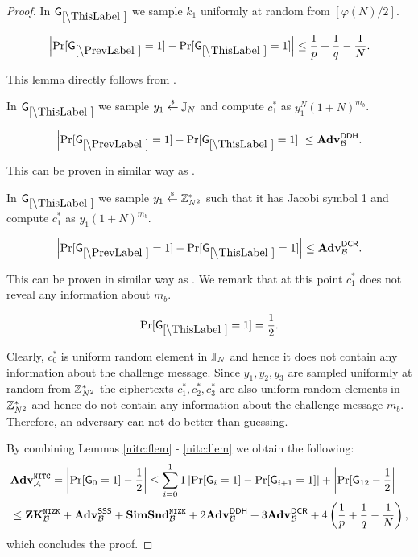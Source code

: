\begin{proof}
In $\games_\thisgame$ we sample $k_1$ uniformly at random from $[\varphi(N)/2]$. 

\begin{lemma}
\[
\left|\Pr[\games_\prevgame = 1] - \Pr[\games_\thisgame = 1]\right| \leq \frac{1}{p}+\frac{1}{q}-\frac{1}{N}.
\]
\end{lemma}

This lemma directly follows from .

In $\games_\thisgame$ we sample $y_1 \stackrel{{\scriptscriptstyle\$}}{\leftarrow} \mathbb{J}_N$ and compute $c_1^*$ as  $y_1^{N} (1+N)^{m_b}$. 

\begin{lemma}
\[
\left|\Pr[\games_\prevgame = 1] - \Pr[\games_\thisgame = 1]\right| \leq \advtg_\advB^\ddh.
\]
\end{lemma}
This can be proven in similar way as .

In $\games_\thisgame$ we sample $y_1 \stackrel{{\scriptscriptstyle\$}}{\leftarrow} \mathbb{Z}_{N^2}^*$ such that it has Jacobi symbol 1 and compute $c_1^*$ as $y_1(1+N)^{m_b}$. 

\begin{lemma}
\[
\left|\Pr[\games_\prevgame = 1] - \Pr[\games_\thisgame = 1]\right| \leq \advtg_\advB^\dcr.
\]
\end{lemma}
This can be proven in similar way as . We remark that at this point $c_1^*$ does not reveal any information about $m_b$.

\begin{lemma}\label{nitc:llem}
\[
\Pr[\games_\thisgame = 1] = \half.
\]
\end{lemma}

Clearly, $c_0^*$ is uniform random element in $\mathbb{J}_N$ and hence it does not contain any information about the challenge message. Since $y_1, y_2, y_3$ are sampled uniformly at random from $\mathbb{Z}_{N^2}^*$ the ciphertexts $c_1^*, c_2^*, c_3^*$ are also uniform random elements in $\mathbb{Z}_{N^2}^*$ and hence do not contain any information about the challenge message $m_b$. Therefore, an adversary can not do better than guessing.

By combining Lemmas \ref{nitc:flem} - \ref{nitc:llem} we obtain the following:
\begin{align*}
&\mathbf{Adv}^{\mathtt{NITC}}_{\mathcal{A}} = \left| \Pr[\mathsf{G}_0 = 1] - \frac{1}{2} \right| \leq \sum_{i=0}^11 \left|\Pr[\mathsf{G}_i = 1] - \Pr[\mathsf{G}_{i+1} = 1] \right| + \left|\Pr[\mathsf{G}_{12}- \frac{1}{2}\right| \\
 &\leq \mathbf{ZK}^{\mathtt{NIZK}}_{\mathcal{B}} + \mathbf{Adv}^{\mathsf{SSS}}_{\mathcal{B}} + \mathbf{SimSnd}^{\mathtt{NIZK}}_{\mathcal{B}} + 2 \mathbf{Adv}^{\mathsf{DDH}}_{\mathcal{B}} + 3 \mathbf{Adv}^{\mathsf{DCR}}_{\mathcal{B}} + 4 \left( \frac{1}{p}+\frac{1}{q}-\frac{1}{N} \right),
\end{align*}
which concludes the proof.
\end{proof}


